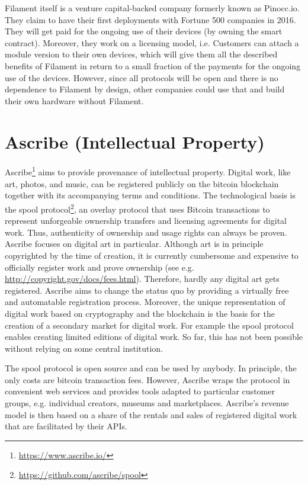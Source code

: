 Filament itself is a venture capital-backed company formerly known as Pinocc.io. 
They claim to have their first deployments with Fortune 500 companies in 2016. 
They will get paid for the ongoing use of their devices (by owning the smart contract). 
Moreover, they work on a licensing model, i.e. Customers can attach a module version 
to their own devices, which will give them all the described benefits of Filament 
in return to a small fraction of the payments for the ongoing use of the devices. 
However, since all protocols will be open and there is no dependence to Filament 
by design, other companies could use that and build their own hardware without 
Filament.

\section{Ascribe (Intellectual Property)}
\label{sec:ecoascribe}

Ascribe\footnote{\url{https://www.ascribe.io/}} aims to provide provenance of intellectual property. Digital work, 
like art, photos, and music, can be registered publicly on the bitcoin blockchain 
together with its accompanying terms and conditions. The technological basis is 
the spool protocol\footnote{\url{https://github.com/ascribe/spool}}, an overlay protocol that uses 
Bitcoin transactions to represent unforgeable ownership transfers and licensing 
agreements for digital work. Thus, authenticity of ownership and usage rights can 
always be proven. Ascribe focuses on digital art in particular. Although art is 
in principle copyrighted by the time of creation, it is currently cumbersome and 
expensive to officially register work and prove ownership (see e.g. \url{http://copyright.gov/docs/fees.html}). 
Therefore, hardly any digital art gets registered. Ascribe aims to change the status 
quo by providing a virtually free and automatable registration process. Moreover, 
the unique representation of digital work based on cryptography and the blockchain 
is the basis for the creation of a secondary market for digital work. For example 
the spool protocol enables creating limited editions of digital work. So far, this 
has not been possible without relying on some central institution.

The spool protocol is open source and can be used by anybody. In principle, the 
only costs are bitcoin transaction fees. However, Ascribe wraps the protocol in 
convenient web services and provides tools adapted to particular customer groups, 
e.g. individual creators, museums and marketplaces. Ascribe's revenue model is 
then based on a share of the rentals and sales of registered digital work that 
are facilitated by their APIs.


